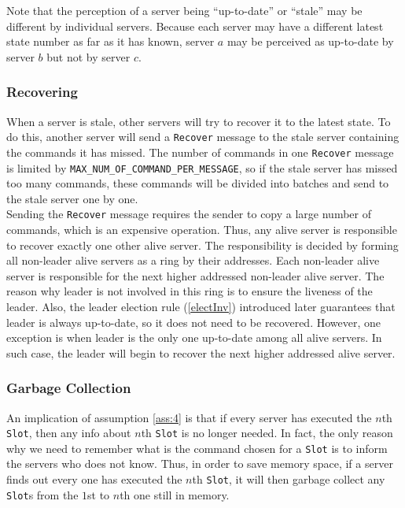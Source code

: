 \documentclass{article}
\numberwithin{equation}{section}
\begin{document}
Note that the perception of a server being ``up-to-date'' or ``stale'' may be different by individual servers. Because each server may have a different latest state number as far as it has known, server $a$ may be perceived as up-to-date by server $b$ but not by server $c$.

\subsubsection{Recovering}
When a server is stale, other servers will try to recover it to the latest state. To do this, another server will send a \verb|Recover| message to the stale server containing the commands it has missed. The number of commands in one \verb|Recover| message is limited by \verb|MAX_NUM_OF_COMMAND_PER_MESSAGE|, so if the stale server has missed too many commands, these commands will be divided into batches and send to the stale server one by one.\\

Sending the \verb|Recover| message requires the sender to copy a large number of commands, which is an expensive operation. Thus, any alive server is responsible to recover exactly one other alive server. The responsibility is decided by forming all non-leader alive servers as a ring by their addresses. Each non-leader alive server is responsible for the next higher addressed non-leader alive server. The reason why leader is not involved in this ring is to ensure the liveness of the leader. Also, the leader election rule (\ref{electInv}) introduced later guarantees that leader is always up-to-date, so it does not need to be recovered. However, one exception is when leader is the only one up-to-date among all alive servers. In such case, the leader will begin to recover the next higher addressed alive server.

\subsubsection{Garbage Collection}\label{sec:gc}
An implication of assumption \ref{ass:4} is that if every server has executed the $n$th \verb|Slot|, then any info about $n$th \verb|Slot| is no longer needed. In fact, the only reason why we need to remember what is the command chosen for a \verb|Slot| is to inform the servers who does not know. Thus, in order to save memory space, if a server finds out every one has executed the $n$th \verb|Slot|, it will then garbage collect any \verb|Slot|s from the $1$st to $n$th one still in memory.
\end{document}
